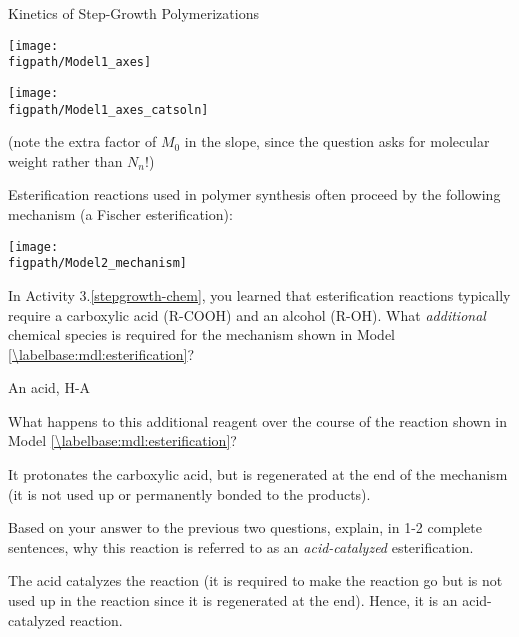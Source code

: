 \begin{activity}{Kinetics of Step-Growth Polymerizations}
\begin{ctqs}
		\begin{solution}[2in]{		
			\centerline{\texttt{[image: \\figpath/Model1\_axes]}}
		}
			\centerline{\texttt{[image: \\figpath/Model1\_axes\_catsoln]}}
			
			(note the extra factor of $M_0$ in the slope, since the question asks for molecular weight rather than $N_n$!)
		
		\end{solution}		

\end{ctqs}
	

\begin{model}
\label{\labelbase:mdl:esterification}

	Esterification reactions used in polymer synthesis often proceed by the following mechanism (a Fischer esterification):
	
	\centerline{\texttt{[image: \\figpath/Model2\_mechanism]}}

\end{model}

\begin{ctqs}

		\question In Activity 3.\ref{stepgrowth-chem}, you learned that esterification reactions typically require a carboxylic acid (R-COOH) and an alcohol (R-OH).  What \emph{additional} chemical species is required for the mechanism shown in Model \ref{\labelbase:mdl:esterification}?
		
			\begin{solution}[0.5in]{}
				An acid, H-A
			\end{solution}
		
		\question What happens to this additional reagent over the course of the reaction shown in Model \ref{\labelbase:mdl:esterification}?
		
			\begin{solution}[1.25in]{}
				It protonates the carboxylic acid, but is regenerated at the end of the mechanism (it is not used up or permanently bonded to the products).
			\end{solution}
		
		\question Based on your answer to the previous two questions, explain, in 1-2 complete sentences, why this reaction is referred to as an \emph{acid-catalyzed} esterification.
		
			\begin{solution}[1.75in]{}
				The acid catalyzes the reaction (it is required to make the reaction go but is not used up in the reaction since it is regenerated at the end).  Hence, it is an acid-catalyzed reaction.
			\end{solution}
			

\end{ctqs}
\end{activity}
